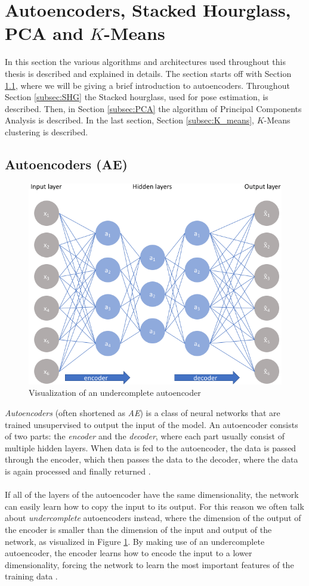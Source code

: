 \documentclass[./main.tex]{subfiles}
\begin{document}
\section{Autoencoders, Stacked Hourglass, PCA and $K$-Means}\label{sec:algorithms}
In this section the various algorithms and architectures used throughout this thesis is described and explained in details. The section starts off with Section \ref{subsec:AE}, where we will be giving a brief introduction to autoencoders. Throughout Section \ref{subsec:SHG} the Stacked hourglass, used for pose estimation, is described. Then, in Section \ref{subsec:PCA} the algorithm of Principal Components Analysis is described. In the last section, Section \ref{subsec:K_means}, $K$-Means clustering is described.

\subsection{Autoencoders (AE)}\label{subsec:AE}
\begin{figure}[htbp]
    \centering
    \includegraphics[width = 7 cm]{entities/AE.png}
    \caption{Visualization of an undercomplete autoencoder \cite{AE}}
    \label{fig:AE}
\end{figure}
\noindent \textit{Autoencoders} (often shortened as \textit{AE}) is a class of neural networks that are trained unsupervised to output the input of the model. An autoencoder consists of two parts: the \textit{encoder} and the \textit{decoder}, where each part usually consist of multiple hidden layers. When data is fed to the autoencoder, the data is passed through the encoder, which then passes the data to the decoder, where the data is again processed and finally returned \cite{DeepLearning}. 
\\
\\
If all of the layers of the autoencoder have the same dimensionality, the network can easily learn how to copy the input to its output. For this reason we often talk about \textit{undercomplete} autoencoders instead, where the dimension of the output of the encoder is smaller than the dimension of the input and output of the network, as visualized in Figure \ref{fig:AE}. By making use of an undercomplete autoencoder, the encoder learns how to encode the input to a lower dimensionality, forcing the network to learn the most important features of the training data \cite{DeepLearning}.
\end{document}
